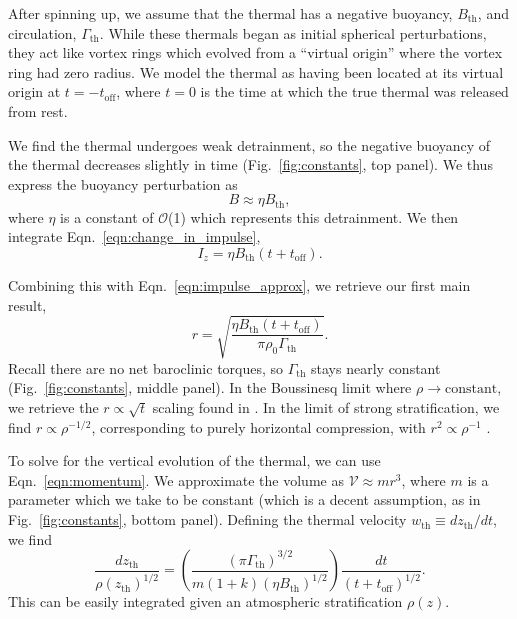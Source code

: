 \documentclass[twocolumn, amsmath, amsfonts, amssymb, trackchanges]{aastex62}
\newcommand{\LJ}{\citetalias{lecoanet&jeevanjee2018}}
\begin{document}
After spinning up, we assume that the thermal has a negative buoyancy, $B_{\text{th}}$, and circulation, $\Gamma_{\text{th}}$.
While these thermals began as initial spherical perturbations, they act like vortex rings which evolved from a ``virtual origin'' where the vortex ring had zero radius.
We model the thermal as having been located at its virtual origin at $t = -t_{\text{off}}$, where $t = 0$ is the time at which the true thermal was released from rest.

We find the thermal undergoes weak detrainment, so the negative buoyancy of the thermal decreases slightly in time (Fig.~\ref{fig:constants}, top panel).
We thus express the buoyancy perturbation as 
\begin{equation}
B \approx \eta B_{\text{th}},
\end{equation}
where $\eta$ is a constant of $\mathcal{O}$(1) which represents this detrainment. 
We then integrate Eqn.~\ref{eqn:change_in_impulse},
\begin{equation*}
I_z = \eta B_{\text{th}} (t + t_{\text{off}}).
\end{equation*}

Combining this with Eqn.~\ref{eqn:impulse_approx}, we retrieve our first main result,
\begin{equation}
r = \sqrt{\frac{\eta B_{\text{th}} (t + t_{\text{off}})}{\pi\rho_0\Gamma_{\text{th}}}}.
\label{eqn:r_theory}
\end{equation}
Recall there are no net baroclinic torques, so $\Gamma_{\text{th}}$ stays nearly constant (Fig.~\ref{fig:constants}, middle panel).
In the Boussinesq limit where $\rho \rightarrow \text{constant}$, we retrieve the $r \propto \sqrt{t}$ scaling found in \LJ.
In the limit of strong stratification, we find $r \propto \rho^{-1/2}$, corresponding to purely horizontal compression, with $r^2 \propto \rho^{-1}$ \citep{brandenburg2016}.

To solve for the vertical evolution of the thermal, we can use Eqn.~\ref{eqn:momentum}.
We approximate the volume as $\mathcal{V} \approx m r^3$, where $m$ is a parameter which we take to be constant (which is a decent assumption, as in Fig.~\ref{fig:constants}, bottom panel).
Defining the thermal velocity $w_{\text{th}} \equiv dz_{\text{th}}/dt$, we find
\begin{equation}
\frac{dz_{\text{th}}}{\rho(z_{\text{th}})^{1/2}} =
\left(\frac{(\pi\Gamma_{\text{th}})^{3/2}}{m(1 + k)(\eta B_{\text{th}})^{1/2}}\right)\frac{dt}{(t + t_{\text{off}})^{1/2}}.
\label{eqn:dz_theory}
\end{equation}
This can be easily integrated given an atmospheric stratification $\rho(z)$.
\end{document}
